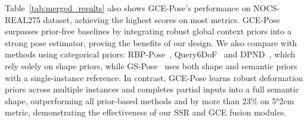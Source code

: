  Table~\ref{tab:merged_results} also shows GCE-Pose’s performance on NOCS-REAL275 dataset, achieving the highest scores on most metrics. GCE-Pose surpasses prior-free baselines by integrating robust global context priors into a strong pose estimator, proving the benefits of our design. We also compare with methods using categorical priors: RBP-Pose~\cite{zhang2022rbp}, Query6DoF~\cite{query6dof} and DPND~\cite{lin2022category}, which rely solely on shape priors, while GS-Pose~\cite{wang2025gs} uses both shape and semantic priors with a single-instance reference. In contrast, GCE-Pose learns robust deformation priors across multiple instances and completes partial inputs into a full semantic shape, outperforming all prior-based methods and by more than $23\%$ on 5°2cm metric, demonstrating the effectiveness of our SSR and GCE fusion modules.


